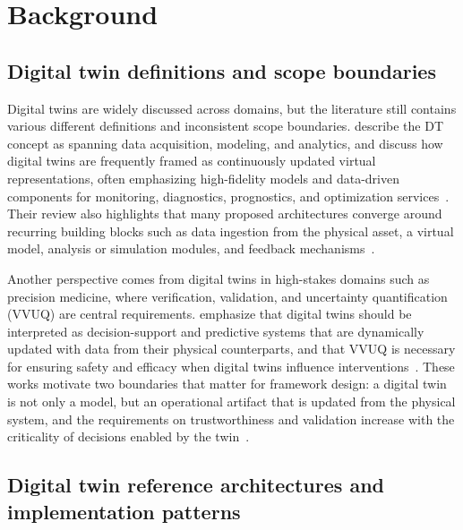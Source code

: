 \section{Background}

\subsection{Digital twin definitions and scope boundaries}
Digital twins are widely discussed across domains, but the literature still contains various different definitions and inconsistent scope boundaries. \citeauthor{inamdar2024_dt_microelectronics} describe the DT concept as spanning data acquisition, modeling, and analytics, and discuss how digital twins are frequently framed as continuously updated virtual representations, often emphasizing high-fidelity models and data-driven components for monitoring, diagnostics, prognostics, and optimization services~\cite{inamdar2024_dt_microelectronics}.
Their review also highlights that many proposed architectures converge around recurring building blocks such as data ingestion from the physical asset, a virtual model, analysis or simulation modules, and feedback mechanisms~\cite{inamdar2024_dt_microelectronics}.

Another perspective comes from digital twins in high-stakes domains such as precision medicine, where verification, validation, and uncertainty quantification (VVUQ) are central requirements. \citeauthor{sel2025_vvuq_precision_dt} emphasize that digital twins should be interpreted as decision-support and predictive systems that are dynamically updated with data from their physical counterparts, and that VVUQ is necessary for ensuring safety and efficacy when digital twins influence interventions~\cite{sel2025_vvuq_precision_dt}.
These works motivate two boundaries that matter for framework design:  a digital twin is not only a model, but an operational artifact that is updated from the physical system, and the requirements on trustworthiness and validation increase with the criticality of decisions enabled by the twin~\cite{inamdar2024_dt_microelectronics,sel2025_vvuq_precision_dt}.

\subsection{Digital twin reference architectures and implementation patterns}
